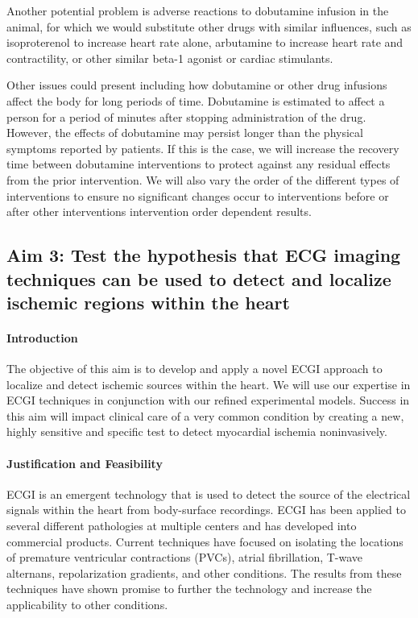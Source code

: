 Another potential problem is adverse reactions to dobutamine
infusion in the animal, for which we would substitute other drugs with
similar influences, such as isoproterenol to increase heart rate alone,
arbutamine to increase heart rate and contractility, or other similar
beta-1 agonist or cardiac stimulants. 

Other issues could present including how dobutamine or other drug infusions affect the body for long periods of time. Dobutamine is estimated to affect a person for a period of minutes after stopping administration of the drug. However, the effects of dobutamine may persist longer than the physical symptoms reported by patients. If this is the case, we will increase the recovery time between dobutamine interventions to protect against any residual effects from the prior intervention. We will also vary the order of the different types of interventions to ensure no significant changes occur to interventions before or after other interventions \ie{} intervention order dependent results. 

\subsection{Aim 3: Test the hypothesis that ECG imaging techniques can be used to detect and localize ischemic regions within the heart}

 \paragraph{Introduction} The objective of this aim is to develop and apply a novel ECGI approach to
localize and detect ischemic sources within the heart. We will use our
expertise in ECGI techniques in conjunction with our refined experimental
models. Success in this aim will impact clinical care of a very common
condition by creating a new, highly sensitive and specific test to detect
myocardial ischemia noninvasively.

\paragraph{Justification and Feasibility}
 ECGI is an emergent technology that
 is used to detect the source of the electrical signals within the heart
 from body-surface recordings.
ECGI has been applied to several different pathologies at multiple centers
and has developed into commercial products. Current techniques have focused
on isolating the locations of premature ventricular contractions (PVCs), atrial
fibrillation, T-wave alternans, repolarization gradients, and other
conditions.\cite{BLZ:Pot2014,BLZ:Dub2015,BLZ:Wan2016a,RSM:Sha2015,BLZ:Wan2018}
The results from these techniques have shown promise to further the
technology and increase the applicability to other conditions.

